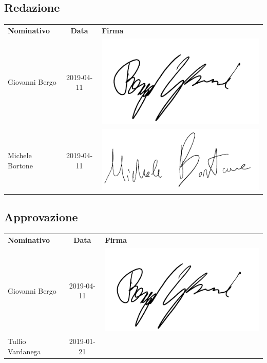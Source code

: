 \subsection{Redazione}

{\renewcommand{\arraystretch}{1.4}%
\begin{table}[H]
	\centering
	\begin{tabular}{| l | c | >{\centering\arraybackslash}m{8cm}
			|} 
		\rowcolor{LightBlue}
		\textbf{\color{white}Nominativo} & 
		\textbf{\color{white}Data} & 
		\textbf{\color{white}Firma} \\
	
	Giovanni Bergo & 2019-04-11 & \includegraphics[scale=0.5]{images/firme/giova.pdf}\\
	Michele Bortone & 2019-04-11 & \includegraphics[scale=0.5]{images/firme/michele.pdf}\\
	 \hline
\end{tabular}
\end{table}
}
\subsection{Approvazione}
{\renewcommand{\arraystretch}{1.4}%
\begin{table}[H]
	\centering
	\begin{tabular}{| l | c | >{\centering\arraybackslash}m{8cm}
			|} 
	\rowcolor{LightBlue}
	\textbf{\color{white}Nominativo} & 
	\textbf{\color{white}Data} & 
	\textbf{\color{white}Firma} \\
	
	Giovanni Bergo & 2019-04-11 & \includegraphics[scale=0.5]{images/firme/giova.pdf}\\[1cm]
	Tullio Vardanega & 2019-01-21 & \\[0.5cm] \hline
\end{tabular}
\end{table}
}
\newpage
